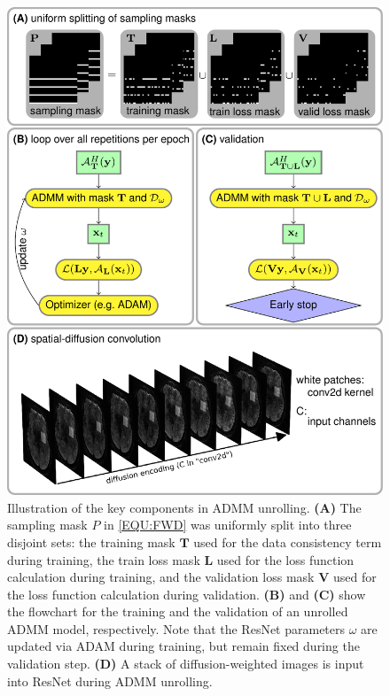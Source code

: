 \documentclass[AMA,STIX2COL,Linenumberson]{MRM}
\begin{document}
\begin{figure}
    \centering
    \includegraphics[width=\columnwidth]{./figures/fig2.png}
    \caption{Illustration of the key components in ADMM unrolling.
        \textbf{(A)} The sampling mask $P$ in \cref{EQU:FWD} was
        uniformly split into three disjoint sets:
        the training mask $\mathbf{T}$ used for
        the data consistency term during training,
        the train loss mask $\mathbf{L}$ used for
        the loss function calculation during training, and
        the validation loss mask $\mathbf{V}$ used for
        the loss function calculation during validation.
        \textbf{(B)} and \textbf{(C)} show the flowchart
        for the training and the validation of an unrolled ADMM model, respectively.
        Note that the ResNet parameters $\omega$ are updated
        via ADAM \cite{kingma_2015_adam} during training,
        but remain fixed during the validation step.
        \textbf{(D)} A stack of diffusion-weighted images
        is input into ResNet during ADMM unrolling.}
    \label{FIG:ZSSSL}
\end{figure}
\end{document}
